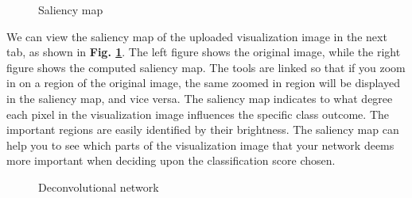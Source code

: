 
\begin{figure}[h!]
    \centering
        \caption{Saliency map}
        \label{saliency-tab}
\end{figure}

\noindent We can view the saliency map of the uploaded visualization image in the next tab, as shown in \textbf{Fig. \ref{saliency-tab}}. The left figure shows the original image, while the right figure shows the computed saliency map. The tools are linked so that if you zoom in on a region of the original image, the same zoomed in region will be displayed in the saliency map, and vice versa. The saliency map indicates to what degree each pixel in the visualization image influences the specific class outcome. The important regions are easily identified by their brightness. The saliency map can help you to see which parts of the visualization image that your network deems more important when deciding upon the classification score chosen.  \\

\begin{figure}[h!]
    \centering
        \caption{Deconvolutional network}
        \label{deconv-tab}
\end{figure}


